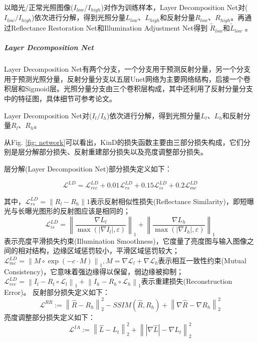 \documentclass[letterpaper,12pt]{article}
\begin{document}
		以暗光/正常光照图像($I_{low}/I_{high}$)对作为训练样本，Layer Decomposition Net对($I_{low}/I_{high}$)依次进行分解，得到光照分量$L_{low}$、$L_{high}$和反射分量$R_{low}$、$R_{high}$。再通过Reflectance Restoration Net和Illumination Adjustment Net得到
		$\tilde{R}_{low}$和$\tilde{L}_{low}$
		。
		
			\subparagraph{Layer Decomposition Net}
			
			Layer Decomposition Net有两个分支，一个分支用于预测反射分量，另一个分支用于预测光照分量，反射分量分支以五层Unet网络为主要网络结构，后接一个卷积层和Sigmoid层。光照分量分支由三个卷积层构成，其中还利用了反射分量分支中的特征图，具体细节可参考论文。
			
			Layer Decomposition Net对($I_l / I_h$)依次进行分解，得到光照分量$L_l$、$L_h$和反射分量$R_l$、$R_h$。
			
			从Fig. \ref{fig: network}可以看出，KinD的损失函数主要由三部分损失构成，它们分别是层分解部分损失、反射重建部分损失以及亮度调整部分损失。
			
			层分解(Layer Decomposition Net)部分损失定义如下：
			
			\begin{equation}
				\mathcal{L}^{LD}=\mathcal{L}_{rec}^{LD}+0.01\mathcal{L}_{rs}^{LD}+0.15\mathcal{L}_{is}^{LD}+0.2\mathcal{L}_{mc}^{LD}
			\end{equation}
			
			其中，$\mathcal{L}_{rs}^{LD}=\left\|R_l-R_h\right\|1$表示反射相似性损失(Reflectance Similarity)，即短曝光与长曝光图形的反射图应该是相同的；$$\mathcal{L}_{is}^{LD}=\left\| \frac{\nabla L_{l}}{\max(\left| \nabla I_{l} \right|,\varepsilon)} \right\|_{1} + \left\| {\frac{\nabla L_{h}}{\max (\left| \nabla I_{h} \right| ,\varepsilon)}}\right\|_{1}$$表示亮度平滑损失约束(Illumination Smoothness)，它度量了亮度图与输入图像之间的相对结构，边缘区域惩罚较小，平滑区域惩罚较大；$\mathcal{L}_{mc}^{LD}={\left\|M\circ\exp(-c\cdot M)\right \|}_{1}, M=\nabla \mathcal{L}_{l}+\nabla \mathcal{L}_{h}$表示相互一致性约束(Mutual Consistency)，它意味着强边缘得以保留，弱边缘被抑制；$\mathcal{L}_{rec}^{LD}={\left \| I_l-R_t \circ \mathcal{L}_l\right\|}_{1} + {\left \| I_h-R_h \circ \mathcal{L}_h\right\|}_{1}$表示重建损失(Reconstruction Error)。
			反射部分损失定义如下：
			\begin{equation}
				\mathcal{L}^{RR}:={\left\| \hat{R}-R_{h} \right\|}^{2}_{2} - SSIM(\hat{R},R_{h}) + {\left\|\nabla\hat{R}-\nabla R_{h} \right\|}^{2}_{2}
			\end{equation}
			亮度调整部分损失定义如下：
			\begin{equation}
				\mathcal{L}^{IA}:={\left\| \hat{L}-L_{t} \right\|}^{2}_{2} + {\left\| \left|\nabla\hat{L}\right|-\nabla L_{t} \right\|}^{2}_{2}
			\end{equation}
			
\end{document}
